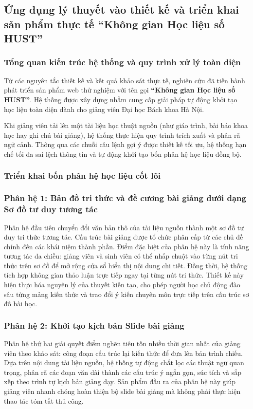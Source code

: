 \subsection{Ứng dụng lý thuyết vào thiết kế và triển khai sản phẩm thực tế ``Không gian Học liệu số HUST''}

\subsubsection{Tổng quan kiến trúc hệ thống và quy trình xử lý toàn diện}
Từ các nguyên tắc thiết kế và kết quả khảo sát thực tế, nghiên cứu đã tiến hành phát triển sản phẩm web thử nghiệm với tên gọi \textbf{``Không gian Học liệu số HUST''}. Hệ thống được xây dựng nhằm cung cấp giải pháp tự động khởi tạo học liệu toàn diện dành cho giảng viên Đại học Bách khoa Hà Nội.

Khi giảng viên tải lên một tài liệu học thuật nguồn (như giáo trình, bài báo khoa học hay ghi chú bài giảng), hệ thống thực hiện quy trình trích xuất và phân rã ngữ cảnh. Thông qua các chuỗi câu lệnh gợi ý được thiết kế tối ưu, hệ thống hạn chế tối đa sai lệch thông tin và tự động khởi tạo bốn phân hệ học liệu đồng bộ.

\subsubsection{Triển khai bốn phân hệ học liệu cốt lõi}

\subsubsection*{Phân hệ 1: Bản đồ tri thức và đề cương bài giảng dưới dạng Sơ đồ tư duy tương tác}
Phân hệ đầu tiên chuyển đổi văn bản thô của tài liệu nguồn thành một sơ đồ tư duy tri thức tương tác. Cấu trúc bài giảng được tổ chức phân cấp từ các chủ đề chính đến các khái niệm thành phần. Điểm đặc biệt của phân hệ này là tính năng tương tác đa chiều: giảng viên và sinh viên có thể nhấp chuột vào từng nút tri thức trên sơ đồ để mở rộng cửa sổ hiển thị nội dung chi tiết. Đồng thời, hệ thống tích hợp không gian thảo luận trực tiếp ngay tại từng nút tri thức. Thiết kế này hiện thực hóa nguyên lý của thuyết kiến tạo, cho phép người học chủ động đào sâu từng mảng kiến thức và trao đổi ý kiến chuyên môn trực tiếp trên cấu trúc sơ đồ bài học.

\subsubsection*{Phân hệ 2: Khởi tạo kịch bản Slide bài giảng}
Phân hệ thứ hai giải quyết điểm nghẽn tiêu tốn nhiều thời gian nhất của giảng viên theo khảo sát: công đoạn cấu trúc lại kiến thức để đưa lên bản trình chiếu. Dựa trên nội dung tài liệu nguồn, hệ thống tự động chắt lọc các thuật ngữ quan trọng, phân rã các đoạn văn dài thành các cấu trúc ý ngắn gọn, súc tích và sắp xếp theo trình tự kịch bản giảng dạy. Sản phẩm đầu ra của phân hệ này giúp giảng viên nhanh chóng hoàn thiện bộ slide bài giảng mà không phải thực hiện thao tác tóm tắt thủ công.


